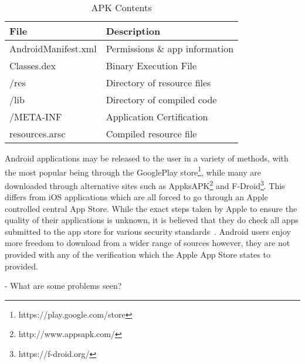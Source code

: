 \documentclass{sig-alternate}
\begin{document}
\begin{center}

\begin{table}[ht]%
\caption{APK Contents}
\label{Table:apkcontents}
  \begin{tabular}{ l | l  }

    \bfseries File & \bfseries Description \\ \hline
    AndroidManifest.xml & Permissions \& app information \\ \hline
    Classes.dex & Binary Execution File \\ \hline
    /res & Directory of resource files \\ \hline
    /lib & Directory of compiled code \\ \hline
    /META-INF & Application Certification \\ \hline
    resources.arsc & Compiled resource file \\
  \end{tabular}
\end{table}
\end{center}


Android applications may be released to the user in a variety of methods, with the most popular being through the GooglePlay store\footnote{https://play.google.com/store}, while many are downloaded through alternative sites such as AppksAPK\footnote{http://www.appsapk.com/} and F-Droid\footnote{https://f-droid.org/}. This differs from iOS applications which are all forced to go through an Apple controlled central App Store. While the exact steps taken by Apple to ensure the quality of their applications is unknown, it is believed that they do check all apps submitted to the app store for various security standards~\cite{Chin:2012:MUC:2335356.2335358}. Android users enjoy more freedom to download from a wider range of sources however, they are not provided with any of the verification which the Apple App Store states to provided.

- What are some problems seen?
\end{document}
